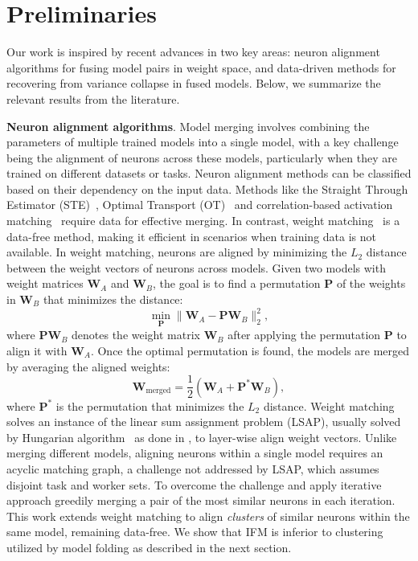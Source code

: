 \documentclass{article}
\newcommand\fakeparagraph[1]{\par\noindent\textbf{{#1}}.\xspace}
\begin{document}
\section{Preliminaries}
\label{sec:background}

Our work is inspired by recent advances in two key areas: neuron alignment algorithms for fusing model pairs in weight space, and data-driven methods for recovering from variance collapse in fused models. Below, we summarize the relevant results from the literature.


\fakeparagraph{Neuron alignment algorithms}
Model merging involves combining the parameters of multiple trained models into a single model, with a key challenge being the alignment of neurons across these models, particularly when they are trained on different datasets or tasks. Neuron alignment methods can be classified based on their dependency on the input data. Methods like the Straight Through Estimator (STE)~\citep{ainsworth2023git}, Optimal Transport (OT)~\citep{singh2020model} and correlation-based activation matching~\citep{li2015convergent} require data for effective merging. 
% 
In contrast, weight matching~\citep{yamada2023revisitingpermutationsymmetrymerging,ainsworth2023git} is a data-free method, making it efficient in scenarios when training data is not available. In weight matching, neurons are aligned by minimizing the $L_2$ distance between the weight vectors of neurons across models. Given two models with weight matrices $\mathbf{W}_A$ and $\mathbf{W}_B$, the goal is to find a permutation $\mathbf{P}$ of the weights in $\mathbf{W}_B$ that minimizes the distance:
\[
\min_{\mathbf{P}} \| \mathbf{W}_A - \mathbf{P}\mathbf{W}_B \|_2^2,
\]
where $\mathbf{P}\mathbf{W}_B$ denotes the weight matrix $\mathbf{W}_B$ after applying the permutation $\mathbf{P}$ to align it with $\mathbf{W}_A$. Once the optimal permutation is found, the models are merged by averaging the aligned weights:
\[
\mathbf{W}_{\text{merged}} = \frac{1}{2} \left( \mathbf{W}_A + \mathbf{P}^*\mathbf{W}_B \right),
\]
where $\mathbf{P}^*$ is the permutation that minimizes the $L_2$ distance.  Weight matching solves an instance of the linear sum assignment problem (LSAP), usually solved by Hungarian algorithm~\citep{Kuhn2010TheHM} as done in \citep{jordan2022repair, ainsworth2023git}, to layer-wise align weight vectors. 
Unlike merging different models, aligning neurons within a single model requires an acyclic matching graph, a challenge not addressed by LSAP, which assumes disjoint task and worker sets. To overcome the challenge \citet{chen2023going} and \citet{he2018multi} apply iterative approach greedily merging a pair of the most similar neurons in each iteration. This work extends weight matching to align \emph{clusters} of similar neurons within the same model, remaining data-free. 
We show that IFM is inferior to clustering utilized by model folding as described in the next section. 
\end{document}
